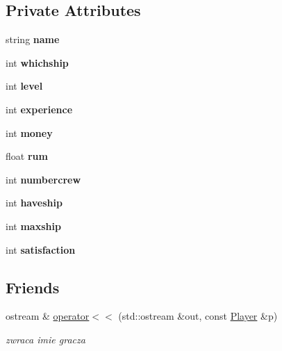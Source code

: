 \subsection*{Private Attributes}
\begin{DoxyCompactItemize}
\item 
\mbox{\label{class_player_acf0355128a99ee20ad9931b760fb2de1}} 
string {\bfseries name}
\item 
\mbox{\label{class_player_a4a81f2a398ffd5113ec2221c47e1bc54}} 
int {\bfseries whichship}
\item 
\mbox{\label{class_player_aa1e06c89dea6981223879e6bfccdb5cd}} 
int {\bfseries level}
\item 
\mbox{\label{class_player_a67293e0bef30ac673b69ec6c4b5f0d07}} 
int {\bfseries experience}
\item 
\mbox{\label{class_player_a9545beef70350d5c3b3a5719a890dd2f}} 
int {\bfseries money}
\item 
\mbox{\label{class_player_aa1d8c626b257c0d4ba2abefc32c77761}} 
float {\bfseries rum}
\item 
\mbox{\label{class_player_a9d6697528b6b2b00da7301ce57cbb1b7}} 
int {\bfseries numbercrew}
\item 
\mbox{\label{class_player_ad947822b1e8d2b2776a8a1d179c176fd}} 
int {\bfseries haveship}
\item 
\mbox{\label{class_player_ae257a5e962dd71467f0b3fd8e15eb0b5}} 
int {\bfseries maxship}
\item 
\mbox{\label{class_player_aaf4313f59bcacfc86b9ab5bd620167c6}} 
int {\bfseries satisfaction}
\end{DoxyCompactItemize}
\subsection*{Friends}
\begin{DoxyCompactItemize}
\item 
\mbox{\label{class_player_a8df091e01a62dda54c43c277fe953118}} 
ostream \& \hyperlink{class_player_a8df091e01a62dda54c43c277fe953118}{operator$<$$<$} (std\+::ostream \&out, const \hyperlink{class_player}{Player} \&p)
\begin{DoxyCompactList}\small\item\em zwraca imie gracza \end{DoxyCompactList}\end{DoxyCompactItemize}


